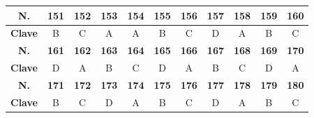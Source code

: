\begin{center}
\begin{tabular}{|c|c|c|c|c|c|c|c|c|c|c|}
\hline
\textbf{N.} & \textbf{151} & \textbf{152} & \textbf{153} & \textbf{154} & \textbf{155} & \textbf{156} & \textbf{157} & \textbf{158} & \textbf{159} & \textbf{160} \\
\hline
\textbf{Clave} & B & C & A & A & B & C & D & A & B & C \\
\hline
\textbf{N.} & \textbf{161} & \textbf{162} & \textbf{163} & \textbf{164} & \textbf{165} & \textbf{166} & \textbf{167} & \textbf{168} & \textbf{169} & \textbf{170} \\
\hline
\textbf{Clave} & D & A & B & C & D & A & B & C & D & A \\
\hline
\textbf{N.} & \textbf{171} & \textbf{172} & \textbf{173} & \textbf{174} & \textbf{175} & \textbf{176} & \textbf{177} & \textbf{178} & \textbf{179} & \textbf{180} \\
\hline
\textbf{Clave} & B & C & D & A & B & C & D & A & B & C \\
\hline
\end{tabular}
\end{center}
